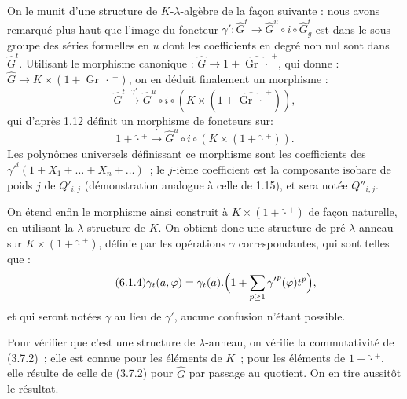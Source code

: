 On le
munit d'une structure de \(K\)-\(\lambda\)-algèbre de la façon suivante : nous avons remarqué plus haut que l'image du foncteur \(\gamma'\colon\widehat G^t\longrightarrow\widehat G^u\circ i\circ\widehat G^t_g\) est dans le sous-groupe des séries formelles en \(u\) dont les coefficients en degré non nul sont dans \(\widehat G^t\). Utilisant le morphisme canonique : \(\widehat G\longrightarrow 1+\widehat{\operatorname{Gr}\,\cdot\,}^{+}\), qui donne : \(\widehat G\longrightarrow K\times(1+\operatorname{Gr}\,\cdot\,{}^{+})\), on en déduit finalement un morphisme :
\[
  \widehat G^t\xrightarrow{\gamma'}\widehat G^u\circ i\circ(K\times(1+\widehat{\operatorname{Gr}\,\cdot\,}^{+})),
\]
qui d'après 1.12 définit un morphisme de foncteurs sur\qquad:
\[
  1+\widehat{\cdot}{}^{+}\xrightarrow{'}\widehat G^u\circ i\circ(K\times(1+\widehat{\cdot}{}^{+})).
\]
Les polynômes universels définissant ce morphisme sont les coefficients des \({\gamma'}^{i}(1+X_1+\dots+X_n+\dots)\)~; le \(j\)-ième coefficient est la composante isobare de poids \(j\) de \(Q'_{i,j}\) (démonstration analogue à celle de 1.15), et sera notée \(Q''_{i,j}\).

On étend enfin le morphisme ainsi construit à \(K\times(1+\widehat{\cdot}{}^{+})\) de façon naturelle, en utilisant la \(\lambda\)-structure de \(K\). On obtient donc une structure de pré-\(\lambda\)-anneau sur \(K\times(1+\widehat{\cdot}{}^{+})\), définie par les opérations \(\gamma\) correspondantes, qui sont telles que :
\begin{equation}\tag{6.1.4}
  \gamma_t(a,\varphi)=\gamma_t(a).\Bigl(1+\sum_{p\ge1}{\gamma'}^{p}(\varphi)t^{p}\Bigr),
\end{equation}
et qui seront notées \(\gamma\) au lieu de \(\gamma'\), aucune confusion n'étant possible.

Pour vérifier que c'est une structure de \(\lambda\)-anneau, on vérifie la commutativité de (3.7.2)~; elle est connue pour les éléments de \(K\)~; pour les éléments de \(1+\widehat{\cdot}{}^{+}\), elle résulte de celle de (3.7.2) pour \(\widehat G\) par passage au quotient. On en tire aussitôt le résultat.



\providecommand{\Ghat}{\widehat G}
\providecommand{\Aqhat}{\widehat A_{\mathbb Q}}
\providecommand{\Ch}{\operatorname{Ch}}
\providecommand{\Log}{\operatorname{Log}}
\renewcommand{\id}{\operatorname{id}}
\providecommand{\gr}{\operatorname{gr}}
\providecommand{\Hom}{\operatorname{Hom}}
\providecommand{\epsi}{\varepsilon}
\providecommand{\clgr}{\operatorname{cl}}
\providecommand{\Fil}{\operatorname{Fil}}
\providecommand{\Gr}{\operatorname{Gr}}
\providecommand{\Sym}{\operatorname{Sym}}


